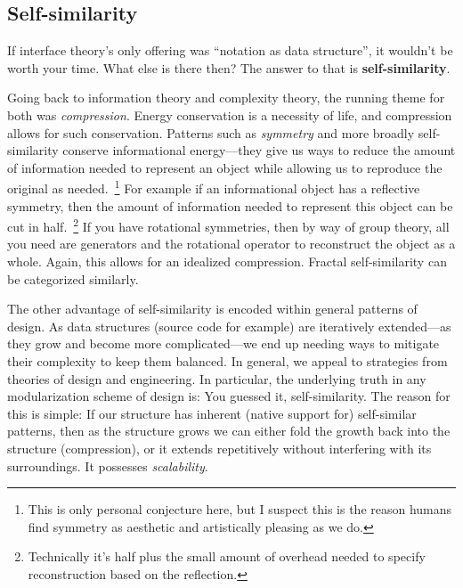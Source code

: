 \documentclass[twoside]{article}
\begin{document}
\subsection*{Self-similarity}

If interface theory's only offering was ``notation as data structure'', it wouldn't be worth your time. What else
is there then? The answer to that is {\bf self-similarity}.

Going back to information theory and complexity theory, the running theme for both was \emph{compression}. Energy conservation
is a necessity of life, and compression allows for such conservation. Patterns such as \emph{symmetry} and more broadly
self-similarity conserve informational energy---they give us ways to reduce the amount of information needed to represent
an object while allowing us to reproduce the original as needed.~\footnote{This is only personal conjecture here, but I suspect
this is the reason humans find symmetry as aesthetic and artistically pleasing as we do.} For example if an informational object
has a reflective symmetry, then the amount of information needed to represent this object can be cut in half.~\footnote{Technically
it's half plus the small amount of overhead needed to specify reconstruction based on the reflection.} If you have rotational
symmetries, then by way of group theory, all you need are generators and the rotational operator to reconstruct the object
as a whole. Again, this allows for an idealized compression. Fractal self-similarity can be categorized similarly.

The other advantage of self-similarity is encoded within general patterns of design. As data structures (source code for example)
are iteratively extended---as they grow and become more complicated---we end up needing ways to mitigate their complexity to keep
them balanced. In general, we appeal to strategies from theories of design and engineering. In particular, the underlying truth
in any modularization scheme of design is: You guessed it, self-similarity. The reason for this is simple: If our structure has
inherent (native support for) self-similar patterns, then as the structure grows we can either fold the growth back into the
structure (compression), or it extends repetitively without interfering with its surroundings. It possesses \emph{scalability}.
\end{document}
